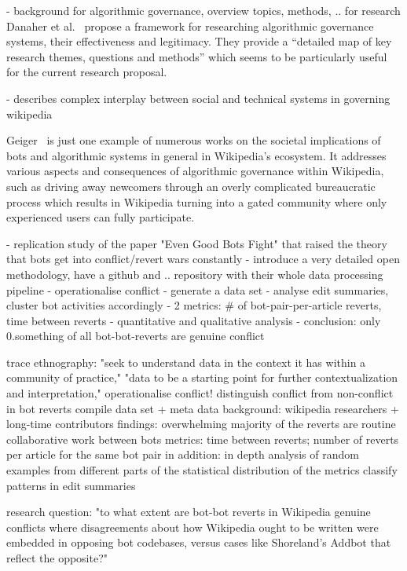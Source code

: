 \documentclass[pdftex,a4paper,11pt]{scrartcl}
\begin{document}
\cite{DanaherEtAl2017}
- background for algorithmic governance, overview topics, methods, .. for research
  Danaher et al.~\cite{DanaherEtAl2017} propose a framework for researching algorithmic governance systems, their effectiveness and legitimacy.
  They provide a ``detailed map of key research themes, questions and methods'' which seems to be particularly useful for the current research proposal.


\cite{Geiger2017}
- describes complex interplay between social and technical systems in governing wikipedia

  Geiger~\cite{Geiger2017} is just one example of numerous works on the societal implications of bots and algorithmic systems in general in Wikipedia's ecosystem.
  It addresses various aspects and consequences of algorithmic governance within Wikipedia, such as driving away newcomers through an overly complicated bureaucratic process which results in Wikipedia turning into a gated community where only experienced users can fully participate.

\cite{GeiHal2017}
- replication study of the paper "Even Good Bots Fight" that raised the theory
  that bots get into conflict/revert wars constantly
- introduce a very detailed open methodology, have a github and .. repository
  with their whole data processing pipeline
- operationalise conflict
- generate a data set
- analyse edit summaries, cluster bot activities accordingly
- 2 metrics: # of bot-pair-per-article reverts, time between reverts
- quantitative and qualitative analysis
- conclusion: only 0.something of all bot-bot-reverts are genuine conflict

trace ethnography: "seek to understand data in the context it has within a community of practice," "data to be a starting point for further contextualization and interpretation,"
operationalise conflict!
distinguish conflict from non-conflict in bot reverts
compile data set + meta data
background: wikipedia researchers + long-time contributors
findings: overwhelming majority of the reverts are routine collaborative work between bots
metrics: time between reverts; number of reverts per article for the same bot pair
in addition: in depth analysis of random examples from different parts of the statistical distribution of the metrics
classify patterns in edit summaries

research question: "to what extent are bot-bot reverts
in Wikipedia genuine conflicts where disagreements about how Wikipedia ought to be written were
embedded in opposing bot codebases, versus cases like Shoreland’s Addbot that reflect the opposite?"
\end{document}
